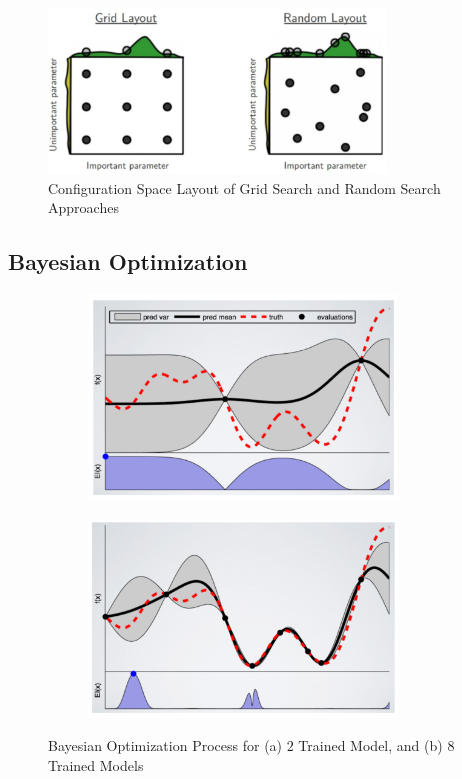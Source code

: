 \begin{figure}
    \centering
    \includegraphics[width=0.8\textwidth]{Images/gridrandsearch.png}
    \caption{Configuration Space Layout of Grid Search and Random Search Approaches \cite{Bergstra}}
    \label{gridrandsearch}
\end{figure}

\subsection{Bayesian Optimization}

\begin{figure}
    \centering
    \begin{subfigure}[]
        \centering
        \includegraphics[width=0.9\textwidth]{Images/2point.png}
    \end{subfigure}
    \begin{subfigure}[]
        \centering
        \includegraphics[width=0.9\textwidth]{Images/8point.png}
    \end{subfigure}
    \caption{Bayesian Optimization Process for (a) $2$ Trained Model, and (b) $8$ Trained Models \cite{Bayesianoptimization}}
    \label{bayesianoptimization}
\end{figure} 

